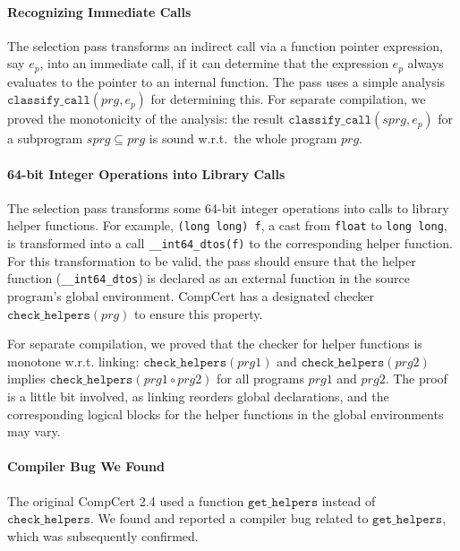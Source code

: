 \paragraph{Recognizing Immediate Calls}
The selection pass transforms an indirect call via a function pointer
expression, say $e_p$, into an immediate call, if it can determine
that the expression $e_p$ always evaluates to the pointer to an
internal function.  The pass uses a simple analysis
$\texttt{classify\_call}(prg, e_p)$ for determining this.  For separate
compilation, we proved the monotonicity of the analysis: the result
$\texttt{classify\_call}(sprg, e_p)$ for a subprogram $sprg \subseteq
prg$ is sound w.r.t.\ the whole program $prg$.

\paragraph{64-bit Integer Operations into Library Calls}
The selection pass transforms some 64-bit integer operations into
calls to library helper functions.  For example, \texttt{(long long)
  f}, a cast from \texttt{float} to \texttt{long long}, is transformed
into a call \texttt{\_\_int64\_dtos(f)} to the corresponding helper
function.  For this transformation to be valid, the pass should ensure
that the helper function (\eg \texttt{\_\_int64\_dtos}) is
declared as an external function in the source program's global
environment.  CompCert has a designated checker
$\texttt{check\_helpers}(prg)$ to ensure this property.

For separate compilation, we proved that the checker for helper
functions is monotone w.r.t. linking: $\texttt{check\_helpers}(prg1)$
and $\texttt{check\_helpers}(prg2)$ implies
$\texttt{check\_helpers}(prg1 \circ prg2)$ for all programs $prg1$ and
$prg2$.  The proof is a little bit involved, as linking reorders
global declarations, and the corresponding logical blocks for the
helper functions in the global environments may vary.


\paragraph{Compiler Bug We Found}
The original CompCert 2.4 used a function $\texttt{get\_helpers}$
instead of $\texttt{check\_helpers}$.  We found and reported a
compiler bug related to $\texttt{get\_helpers}$, which was
subsequently confirmed.

